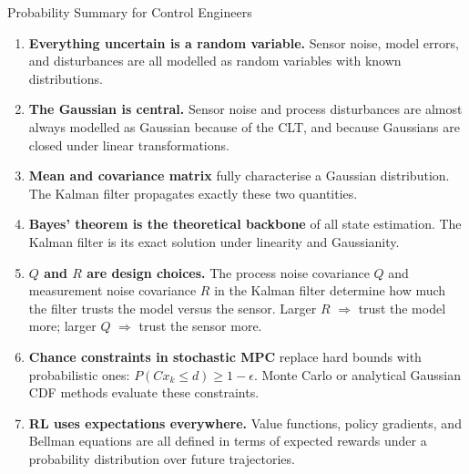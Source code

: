 \begin{summarybox}{Probability Summary for Control Engineers}
\begin{enumerate}[noitemsep]
  \item \textbf{Everything uncertain is a random variable.}  Sensor
        noise, model errors, and disturbances are all modelled as
        random variables with known distributions.
  \item \textbf{The Gaussian is central.}  Sensor noise and process
        disturbances are almost always modelled as Gaussian because of
        the CLT, and because Gaussians are closed under linear
        transformations.
  \item \textbf{Mean and covariance matrix} fully characterise a
        Gaussian distribution.  The Kalman filter propagates exactly
        these two quantities.
  \item \textbf{Bayes' theorem is the theoretical backbone} of all
        state estimation.  The Kalman filter is its exact solution
        under linearity and Gaussianity.
  \item \textbf{$Q$ and $R$ are design choices.}  The process noise
        covariance $Q$ and measurement noise covariance $R$ in the
        Kalman filter determine how much the filter trusts the model
        versus the sensor.  Larger $R$ $\Rightarrow$ trust the model
        more; larger $Q$ $\Rightarrow$ trust the sensor more.
  \item \textbf{Chance constraints in stochastic MPC} replace hard
        bounds with probabilistic ones:
        $P(Cx_k \leq d) \geq 1-\epsilon$.  Monte Carlo or analytical
        Gaussian CDF methods evaluate these constraints.
  \item \textbf{RL uses expectations everywhere.}  Value functions,
        policy gradients, and Bellman equations are all defined in
        terms of expected rewards under a probability distribution over
        future trajectories.
\end{enumerate}
\end{summarybox}

